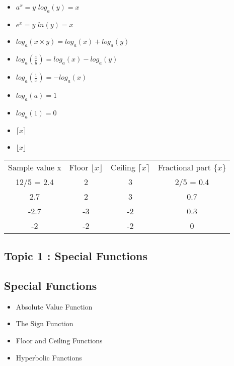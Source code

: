\documentclass[a4paper,12pt]{article}
\begin{document}

\begin{itemize}
\item $a^x = y$  $log_a(y) = x$

\item $e^x = y$  $ln(y)=x$

\item $log_a(x\times y) = log_a(x) + log_a(y)$

\item $log_a(\frac{x}{y}) = log_a(x) - log_a(y)$

\item $log_a(\frac{1}{x}) = - log_a(x)$

\item $log_a(a) = 1$

\item $log_a(1) = 0$
\end{itemize}


\begin{itemize}
\item $\lceil x\rceil$

\item $\lfloor x\rfloor$
\end{itemize}

\begin{tabular}{|c|c|c|c|}
\hline Sample value x & Floor $\lfloor x\rfloor$ & Ceiling  $\lceil x\rceil$ & Fractional part $ \{ x \} $\\
12/5 = 2.4 &2&3&2/5 = 0.4\\
2.7&2&3&0.7\\
-2.7&-3&-2&0.3\\
-2&-2&-2&0\\
\hline 
\end{tabular} 


\subsection*{Topic 1 : Special Functions}

\subsection{Special Functions}
\begin{itemize}
\item Absolute Value Function
\item The Sign Function
\item Floor and Ceiling Functions
\item Hyperbolic Functions
\end{itemize}
\end{document}
